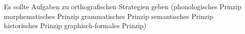 Es sollte Aufgaben zu orthografischen Strategien geben (phonologisches Prinzip
morphematisches Prinzip
grammatisches Prinzip
semantisches Prinzip
historisches Prinzip
graphisch-formales Prinzip)
